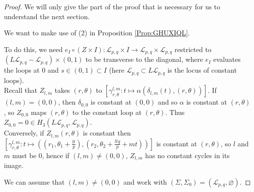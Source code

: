 \documentclass[reqno]{amsart}
\theoremstyle{definition}
\theoremstyle{remark}
\begin{document}
\begin{proof}

    We will only give the part of the proof that is necessary for
    us to understand the next section.\\
    \linebreak
    




    We want to make use of (2) in
    Proposition \ref{Prop:GHUXIQL}.

    To do this, we need $e_I \circ \left( Z \times I \right) 
    \colon \mathcal{L}_{p,q} \times I \to 
    \mathcal{L}_{p,q} \times \mathcal{L}_{p,q}$ 
    restricted to
    $(L \mathcal{L}_{p,q} - \mathcal{L}_{p,q}) \times (0,1) $
    to be transverse
    to the diagonal, where
    $e_I$ evaluates the loops at $0$ and
    $s \in \left( 0,1 \right)  \subset I$ (here
    $\mathcal{L}_{p,q} \subset L \mathcal{L}_{p,q}$ is the
    locus of constant loops).\\
    \linebreak
    Recall that
    $Z_{l,m}$ takes
    $\left( r, \theta \right) $ to
    $\left[ \gamma_{r,\theta}^{l,m} \colon
    t\mapsto \alpha \left( \delta_{l,m}(t), (r, \theta) \right) \right] $.
    If $(l,m)= (0,0)$, then $\delta_{0,0}$ is constant
    at $(0,0)$ and so
    $\alpha$ is constant at
    $\left( r, \theta \right) $, so $Z_{0,0}$ maps
    $(r, \theta)$ to the constant loop at $(r, \theta)$. Thus
    $Z_{0,0} = 0 \in H_3 \left( L \mathcal{L}_{p,q},
    \mathcal{L}_{p,q} \right) $.\\
    \linebreak
    Conversely, if
    $Z_{l,m}(r, \theta)$ is constant then
    $\left[ \gamma_{r, \theta}^{l,m} \colon
    t \mapsto 
\left( \left( r_1, \theta_1 + \frac{lt}{p} \right) ,
\left( r_2, \theta_2 + \frac{ltq}{p} +mt \right) \right) \right] $ 
    is constant at 
    $(r, \theta)$, so $l$ and $m$ must be $0$, hence
    if $(l,m) \neq (0,0)$, $Z_{l,m}$ has no constant
    cycles in its image.

    We can assume that $(l,m) \neq (0,0)$ and work
    with $\left( \Sigma , \Sigma_0 \right) = 
    \left( \mathcal{L}_{p,q}, \varnothing \right) $.


\end{proof}
\end{document}
